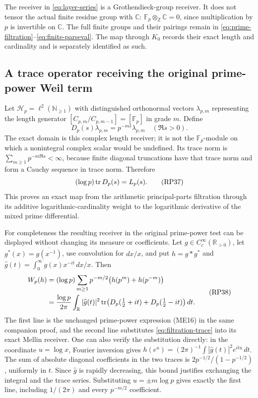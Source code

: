 \documentclass[11pt,a4paper]{article}
\theoremstyle{definition}\newtheorem{definition}[theorem]{Definition}
\begin{document}
The receiver in \eqref{eq:layer-series} is a Grothendieck-group receiver.
It does not tensor the actual finite residue group with $\mathbb C$:
$\mathbb F_p\otimes_{\mathbb Z}\mathbb C=0$, since multiplication by
$p$ is invertible on $\mathbb C$. The full finite groups and their
pairings remain in \eqref{eq:prime-filtration}--\eqref{eq:finite-parseval}.
The map through $K_0$ records their exact length and cardinality and
is separately identified as such.

\subsection{A trace operator receiving the original prime-power Weil term}

Let $\mathcal H_p=\ell^2(\mathbb N_{\ge1})$ with distinguished
orthonormal vectors $\lambda_{p,m}$ representing the length generator
$[C_{p,m}/C_{p,m-1}]=[\mathbb F_p]$ in grade $m$. Define
\[
 D_p(s)\lambda_{p,m}=p^{-ms}\lambda_{p,m}\quad(\Re s>0).
 \tag{RP36}\label{eq:filtration-trace-operator}
\]
The exact domain is this complex length receiver; it is not the
$\mathbb F_p$-module on which a nonintegral complex scalar would be
undefined. Its trace norm is
$\sum_{m\ge1}p^{-m\Re s}<\infty$, because finite diagonal truncations
have that trace norm and form a Cauchy sequence in trace norm. Therefore
\[
 (\log p)\operatorname{tr} D_p(s)=L_p(s).
 \tag{RP37}\label{eq:filtration-trace}
\]
This proves an exact map from the arithmetic principal-parts filtration
through its additive logarithmic-cardinality weight to the logarithmic
derivative of the mixed prime differential.

For completeness the resulting receiver in the original prime-power
test can be displayed without changing its measure or coefficients.
Let $g\in C_c^\infty(\mathbb R_{>0})$, let
$g^*(x)=\overline{g(x^{-1})}$, use convolution for $dx/x$, and put
$h=g*g^*$ and
$\widehat g(t)=\int_0^\infty g(x)x^{-it}\,dx/x$. Then
\[
\begin{split}
 W_p(h)
 &=(\log p)\sum_{m\ge1}p^{-m/2}\bigl(h(p^m)+h(p^{-m})\bigr)\\
 &=\frac{\log p}{2\pi}\int_{\mathbb R}|\widehat g(t)|^2
 \operatorname{tr}\bigl(D_p(\tfrac12+it)+D_p(\tfrac12-it)\bigr)\,dt.
\end{split}
 \tag{RP38}\label{eq:filtration-Weil-term}
\]
The first line is the unchanged prime-power expression (ME16) in the
same companion proof, and the second line substitutes
\eqref{eq:filtration-trace} into its exact Mellin receiver. One can
also verify the substitution directly: in the coordinate $u=\log x$,
Fourier inversion gives
$h(e^u)=(2\pi)^{-1}\int|\widehat g(t)|^2e^{itu}\,dt$.
The sum of absolute diagonal coefficients in the two traces is
$2p^{-1/2}/(1-p^{-1/2})$, uniformly in $t$. Since $\widehat g$ is
rapidly decreasing, this bound justifies exchanging the integral and
the trace series. Substituting $u=\pm m\log p$ gives exactly the first
line, including $1/(2\pi)$ and every $p^{-m/2}$ coefficient.
\end{document}
